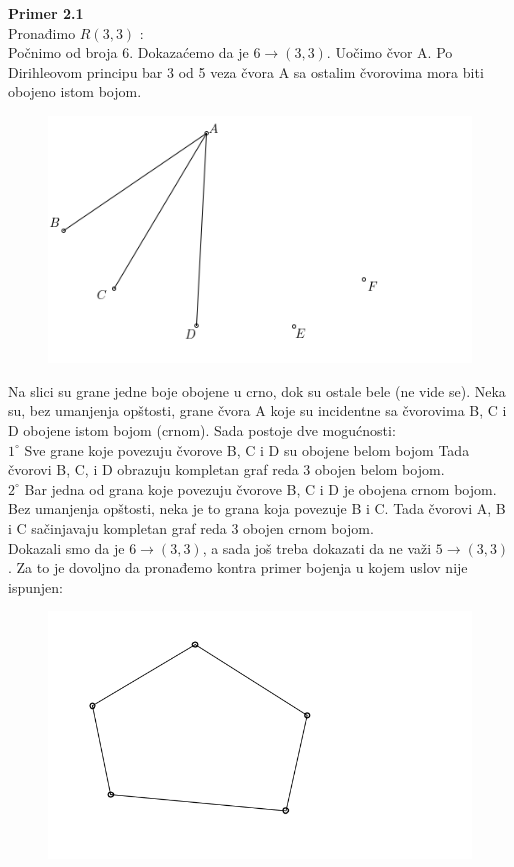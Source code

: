 \documentclass[12pt,a4paper]{article}
\begin{document}
	{\noindent\fontsize{12pt}{12pt}\textbf{Primer 2.1}}
	\vspace{0.5em}
	\\	
	Pronađimo $R(3,3)$ :
	\\Počnimo od broja 6. Dokazaćemo da je $6 \rightarrow (3, 3)$. Uočimo čvor A. Po Dirihleovom principu bar 3 od 5 veza čvora A sa ostalim čvorovima mora biti obojeno istom bojom. 
	\begin{figure}[h]
	\centering
	\includegraphics[scale=2.3]{r33.png}
	\end{figure}
	
	\noindent Na slici su grane jedne boje obojene u crno, dok su ostale bele (ne vide se).
	Neka su, bez umanjenja opštosti, grane čvora A koje su incidentne sa čvorovima B, C i D obojene istom bojom (crnom). Sada postoje dve mogućnosti: 
	\vspace{1em}
	\\
	$1^\circ$ Sve grane koje povezuju čvorove B, C i D su obojene belom bojom Tada čvorovi B, C, i D obrazuju kompletan graf reda 3 obojen belom bojom.
	\vspace{0.5em}
	\\
	$2^\circ$ Bar jedna od grana koje povezuju čvorove B, C i D je obojena crnom bojom. Bez umanjenja opštosti, neka je to grana koja povezuje B i C. Tada čvorovi A, B i C sačinjavaju kompletan graf reda 3 obojen crnom bojom.
	\vspace{0.5em}
	\\Dokazali smo da je $6 \rightarrow (3, 3)$, a sada još treba dokazati da ne važi $5 \rightarrow (3, 3)$. Za to je dovoljno da pronađemo kontra primer bojenja u kojem uslov nije ispunjen:
	\begin{figure}[h]
	\centering
	\includegraphics[scale=1.1]{r33kp.png}
	\end{figure}
	
\end{document}
